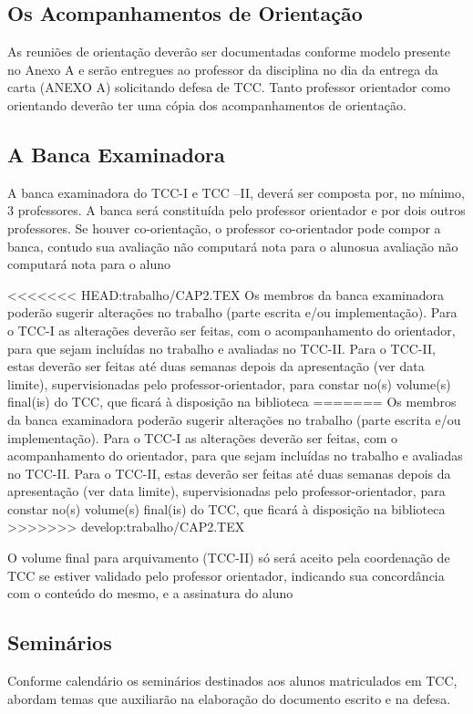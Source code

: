 \subsection{Os Acompanhamentos de Orientação}

As reuniões de orientação deverão ser documentadas conforme modelo presente no Anexo A e serão entregues ao professor da disciplina no dia da entrega da carta (ANEXO A) solicitando defesa de TCC.
Tanto professor orientador como orientando deverão ter uma cópia dos acompanhamentos de orientação.
	

\subsection{A Banca Examinadora}

A banca examinadora do TCC-I e TCC –II, deverá ser composta por, no mínimo, 3 professores. A banca será constituída pelo 
professor orientador e por dois outros professores. Se houver co-orientação, o professor co-orientador pode compor a banca, contudo sua avaliação não computará nota para o alunosua avaliação não computará nota para o aluno 

<<<<<<< HEAD:trabalho/CAP2.TEX
Os membros da banca examinadora poderão sugerir alterações no trabalho (parte escrita e/ou implementação). Para o TCC-I as alterações deverão ser feitas, com o acompanhamento do orientador, para que sejam incluídas no trabalho e avaliadas no TCC-II. Para o TCC-II, estas deverão ser feitas até duas semanas depois da apresentação (ver data limite), supervisionadas pelo professor-orientador, para constar no(s) volume(s) final(is) do TCC, que ficará à disposição na biblioteca
=======
Os membros da banca examinadora poderão sugerir alterações no trabalho (parte escrita e/ou implementação). Para o TCC-I as alterações deverão ser feitas, com o acompanhamento do orientador, para que sejam incluídas no trabalho e avaliadas no TCC-II. Para o TCC-II, estas deverão ser feitas at\'e duas semanas depois da apresentação (ver data limite), supervisionadas pelo professor-orientador, para constar no(s) volume(s) final(is) do TCC, que ficará à disposição na biblioteca
>>>>>>> develop:trabalho/CAP2.TEX

O volume final para arquivamento (TCC-II) só será aceito pela coordenação de TCC se estiver validado pelo professor orientador, indicando sua concordância com o conteúdo do mesmo, e a assinatura do aluno


\subsection{Seminários}
Conforme calendário os seminários destinados aos alunos matriculados em TCC, abordam temas que auxiliarão na elaboração do documento escrito e na defesa.

